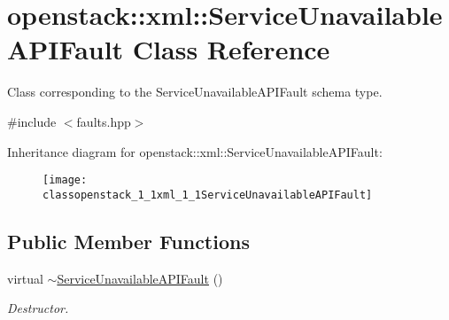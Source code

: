 \hypertarget{classopenstack_1_1xml_1_1ServiceUnavailableAPIFault}{
\section{openstack::xml::ServiceUnavailableAPIFault Class Reference}
\label{classopenstack_1_1xml_1_1ServiceUnavailableAPIFault}
}


Class corresponding to the ServiceUnavailableAPIFault schema type.  




{\ttfamily \#include $<$faults.hpp$>$}

Inheritance diagram for openstack::xml::ServiceUnavailableAPIFault:\begin{figure}[H]
\begin{center}
\leavevmode
\texttt{[image: classopenstack\_1\_1xml\_1\_1ServiceUnavailableAPIFault]}
\end{center}
\end{figure}
\subsection*{Public Member Functions}
\begin{DoxyCompactItemize}
\item 
\hypertarget{classopenstack_1_1xml_1_1ServiceUnavailableAPIFault_a05a3c4671d52c838c78d58605ea10654}{
virtual \hyperlink{classopenstack_1_1xml_1_1ServiceUnavailableAPIFault_a05a3c4671d52c838c78d58605ea10654}{$\sim$ServiceUnavailableAPIFault} ()}
\label{classopenstack_1_1xml_1_1ServiceUnavailableAPIFault_a05a3c4671d52c838c78d58605ea10654}

\begin{DoxyCompactList}\small\item\em Destructor. \item\end{DoxyCompactList}\end{DoxyCompactItemize}
